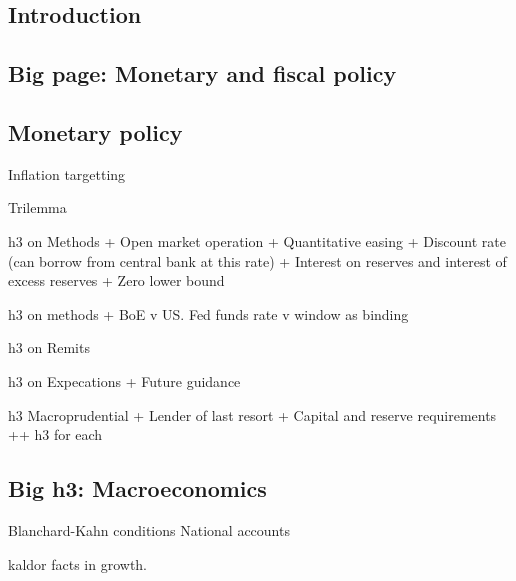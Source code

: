 
\subsection{Introduction}

\subsection{Big page: Monetary and fiscal policy}
\subsection{Monetary policy}
Inflation targetting

Trilemma

h3 on Methods
+ Open market operation
+ Quantitative easing
+ Discount rate (can borrow from central bank at this rate)
+ Interest on reserves and interest of excess reserves
+ Zero lower bound

h3 on methods
+ BoE v US. Fed funds rate v window as binding

h3 on Remits

h3 on Expecations
+ Future guidance

h3 Macroprudential
+ Lender of last resort
+ Capital and reserve requirements
++ h3 for each

\subsection{Big h3: Macroeconomics}
Blanchard-Kahn conditions
National accounts

kaldor facts in growth.


